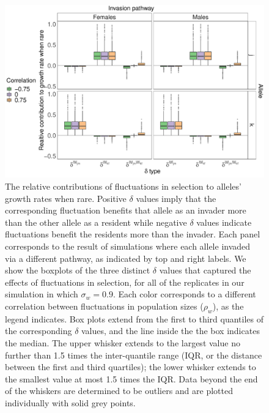 \documentclass[12pt]{article}
\begin{document}
\begin{figure}[H]
  \centerline{\includegraphics[width=1\textwidth]{box_plots_selection.pdf}}
  \caption{The relative contributions of fluctuations in selection to alleles' growth rates when rare. Positive $\delta$ values imply that the corresponding fluctuation benefits that allele as an invader more than the other allele as a resident while negative $\delta$ values indicate fluctuations benefit the residents more than the invader. Each panel corresponds to the result of simulations where each allele invaded via a different pathway, as indicated by top and right labels. We show the boxplots of the three distinct $\delta$ values that captured the effects of fluctuations in selection, for all of the replicates in our simulation in which $\sigma_{w}=0.9$. Each color corresponds to a different correlation between fluctuations in population sizes ($\rho_{w}$), as the legend indicates. Box plots extend from the first to third quantiles of the corresponding $\delta$ values, and the line inside the the box indicates the median. The upper whisker extends to the largest value no further than 1.5 times the inter-quantile range (IQR, or the distance between the first and third quartiles); the lower whisker extends to the smallest value at most 1.5 times the IQR. Data beyond the end of the whiskers are determined to be outliers and are plotted individually with solid grey points. }
    \label{fig:boxes_selection}
\end{figure}

\clearpage


\end{document}
